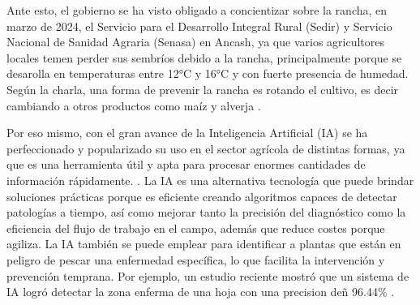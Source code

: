  Ante esto, el gobierno se ha visto obligado a concientizar sobre la rancha, en marzo de 2024, el Servicio para el Desarrollo Integral Rural (Sedir) y Servicio Nacional de Sanidad Agraria (Senasa) en Ancash, ya que varios agricultores locales temen perder sus sembríos debido a la rancha, principalmente porque se desarolla en temperaturas entre 12°C y 16°C y con fuerte presencia de humedad. Según la charla, una forma de prevenir la rancha es rotando el cultivo, es decir cambiando a otros productos como maíz y alverja \parencite{cr_agroinforma2}.
 
 Por eso mismo, con el gran avance de la Inteligencia Artificial (IA) se ha perfeccionado y popularizado su uso en el sector agrícola de distintas formas, ya que es una herramienta útil y apta para procesar enormes cantidades de información rápidamente. . La IA es una alternativa tecnología que puede brindar soluciones prácticas porque es eficiente creando algoritmos capaces de detectar patologías a tiempo, así como mejorar tanto la precisión del diagnóstico como la eficiencia del flujo de trabajo en el campo, además que reduce costes porque agiliza. La IA también se puede emplear para identificar a plantas que están en peligro de pescar una enfermedad específica, lo que facilita la intervención y prevención temprana. Por ejemplo, un estudio reciente mostró que un sistema de IA logró detectar la zona enferma de una hoja con una precision deñ 96.44\% \parencite{cr_iaplanta}.
 
